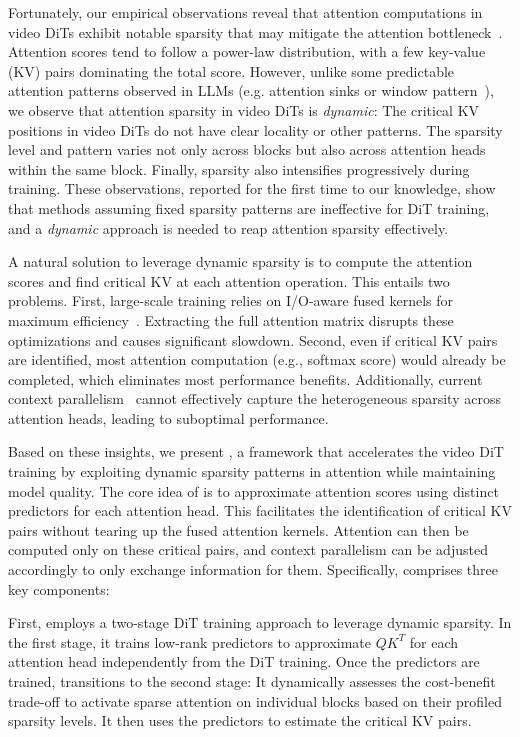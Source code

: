 Fortunately, our empirical observations reveal that attention computations in video DiTs exhibit notable sparsity that may mitigate the attention bottleneck~\cite{zhang2023h2o,xiao2023streamllm}. Attention scores tend to follow a power-law distribution, with a few key-value (KV) pairs dominating the total score. However, unlike some predictable attention patterns observed in LLMs (e.g. attention sinks or window pattern~\cite{mistral7b,xiao2023streamllm}), we observe that attention sparsity in video DiTs is \textit{dynamic}: 
The critical KV positions in video DiTs do not have clear locality or other patterns.
The sparsity level and pattern varies not only across blocks but also across attention heads within the same block. 
Finally, sparsity also intensifies progressively during training. 
These observations, reported for the first time to our knowledge, show that methods assuming fixed sparsity patterns are ineffective for DiT training, and a \textit{dynamic} approach is needed to reap attention sparsity effectively.

A natural solution to leverage dynamic sparsity is to compute the attention scores and find critical KV at each attention operation. 
This entails two problems. 
First, large-scale training relies on I/O-aware fused kernels for maximum efficiency~\cite{dao2022flashattention1,dao2023flashattention2}. 
Extracting the full attention matrix disrupts these optimizations and causes significant slowdown. 
Second, even if critical KV pairs are identified, most attention computation (e.g., softmax score) would already be completed, which eliminates most performance benefits. 
Additionally, current context parallelism~\cite{jacobs2023deepspeedulysses,liu2023ring} cannot effectively capture the heterogeneous sparsity across attention heads, leading to suboptimal performance.


Based on these insights, we present \sys, a framework that accelerates the video DiT training by exploiting dynamic sparsity patterns in attention while maintaining model quality. The core idea of \sys is to approximate attention scores using distinct predictors for each attention head. This facilitates the identification of critical KV pairs without tearing up the fused attention kernels.
Attention can then be computed only on these critical pairs, and context parallelism can be adjusted accordingly to only exchange information for them. Specifically, \sys comprises three key components:

First, \sys employs a two-stage DiT training approach to leverage dynamic sparsity. In the first stage, it trains low-rank predictors to approximate $QK^T$ for each attention head independently from the DiT training. Once the predictors are trained, \sys transitions to the second stage: It dynamically assesses the cost-benefit trade-off to activate sparse attention on individual blocks based on their profiled sparsity levels. 
It then uses the predictors to estimate the critical KV pairs.


